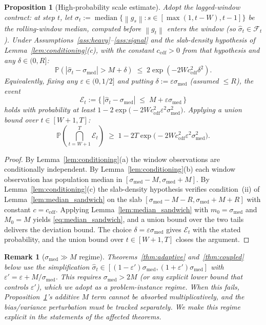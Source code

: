 \documentclass[11pt]{article}
\newtheorem{proposition}[theorem]{Proposition}
\newtheorem{remark}[theorem]{Remark}
\theoremstyle{definition}
\newcommand{\Prob}{\mathbb{P}}
\newcommand{\norm}[1]{\left\| #1 \right\|}
\newcommand{\abs}[1]{\left| #1 \right|}
\newcommand{\shat}{\hat{\sigma}}
\newcommand{\Filt}{\mathcal{F}}
\begin{document}
\begin{proposition}[High-probability scale estimate]\label{prop:scale}
Adopt the lagged-window contract: at step $t$, let
$\shat_t := \operatorname{median}\bigl\{\norm{g_s} : s \in [\max(1, t-W), t-1]\bigr\}$
be the rolling-window median, computed \emph{before} $\norm{g_t}$ enters the
window (so $\shat_t \in \Filt_t$). Under
Assumptions~\ref{ass:heavy}--\ref{ass:signal} and the slab-density hypothesis
of Lemma~\ref{lem:conditioning}\textup{(c)}, with the constant
$c_{\mathrm{cdf}} > 0$ from that hypothesis and any $\delta \in (0, R]$:
\[
  \Prob\!\left(\abs{\shat_t - \sigma_{\mathrm{med}}} > M + \delta\right)
  \;\leq\; 2\exp\!\left(-2W c_{\mathrm{cdf}}^2\delta^2\right).
\]
Equivalently, fixing any $\varepsilon \in (0, 1/2]$ and putting $\delta := \varepsilon \sigma_{\mathrm{med}}$ (assumed $\leq R$), the event
\[
  \mathcal{E}_t := \bigl\{\,\abs{\shat_t - \sigma_{\mathrm{med}}}
    \;\leq\; M + \varepsilon\sigma_{\mathrm{med}}\,\bigr\}
\]
holds with probability at least
$1 - 2\exp\bigl(-2W c_{\mathrm{cdf}}^2\varepsilon^2\sigma_{\mathrm{med}}^2\bigr)$.
Applying a union bound over $t \in [W+1, T]$:
\[
  \Prob\!\left(\bigcap_{t=W+1}^T \mathcal{E}_t\right)
  \;\geq\; 1 - 2T\exp\bigl(-2W c_{\mathrm{cdf}}^2\varepsilon^2\sigma_{\mathrm{med}}^2\bigr).
\]
\end{proposition}

\begin{proof}
By Lemma~\ref{lem:conditioning}\textup{(a)} the window observations are
conditionally independent. By Lemma~\ref{lem:conditioning}\textup{(b)} each
window observation has population median in
$[\sigma_{\mathrm{med}} - M, \sigma_{\mathrm{med}} + M]$. By
Lemma~\ref{lem:conditioning}\textup{(c)} the slab-density hypothesis
verifies condition~(ii) of Lemma~\ref{lem:median_sandwich} on the slab
$[\sigma_{\mathrm{med}} - M - R, \sigma_{\mathrm{med}} + M + R]$ with constant
$c = c_{\mathrm{cdf}}$. Applying Lemma~\ref{lem:median_sandwich} with
$m_0 = \sigma_{\mathrm{med}}$ and $M_0 = M$ yields
\eqref{eq:median_sandwich}, and a union bound over the two tails delivers
the deviation bound. The choice $\delta = \varepsilon\sigma_{\mathrm{med}}$
gives $\mathcal{E}_t$ with the stated probability, and the union bound
over $t \in [W+1, T]$ closes the argument.
\end{proof}

\begin{remark}[$\sigma_{\mathrm{med}} \gg M$ regime]\label{rem:hi_noise}
Theorems~\ref{thm:adaptive} and~\ref{thm:coupled} below use the simplification
$\shat_t \in [(1-\varepsilon')\sigma_{\mathrm{med}}, (1+\varepsilon')\sigma_{\mathrm{med}}]$
with $\varepsilon' = \varepsilon + M/\sigma_{\mathrm{med}}$. This requires
$\sigma_{\mathrm{med}} > 2M$ \emph{(or any explicit lower bound that controls
$\varepsilon'$)}, which we adopt as a problem-instance regime. When this fails,
Proposition~\ref{prop:scale}'s additive $M$ term cannot be absorbed
multiplicatively, and the bias/variance perturbation must be tracked
separately. We make this regime explicit in the statements of the affected
theorems.
\end{remark}
\end{document}
